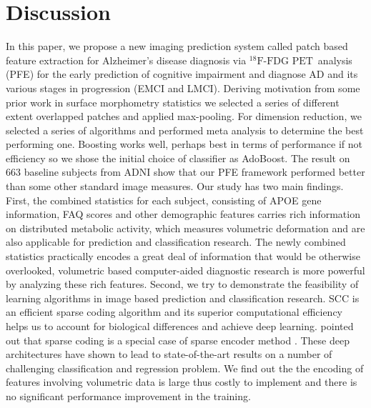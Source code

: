 \documentclass[authoryear,preprint,revi	ew,12pt]{elsarticle}
\newcommand{\Alz} {{Alzheimer\textquoteright s} }
\newcommand{\FDGPET}   {$ ^{18}\textrm{F-FDG PET} $~}
\begin{document}
\section{Discussion}
In this paper, we propose a new imaging prediction system called patch based feature extraction for \Alz disease diagnosis via \FDGPET analysis (PFE) for the early prediction of cognitive impairment and diagnose AD and its various stages in progression (EMCI and LMCI). Deriving motivation from some prior work in surface morphometry statistics  \citep{zhang2016applying,zhang2016hyperbolic}  we selected a series of different extent overlapped patches and applied max-pooling. For dimension reduction, we selected a series of algorithms and performed meta analysis to determine the best performing one. Boosting works well, perhaps best in terms of performance if not efficiency so we shose the initial choice of classifier as AdoBoost. The result on 663 baseline subjects from ADNI show that our PFE framework performed better than some other standard image measures. Our study has two main findings. First, the combined statistics for each subject, consisting of APOE gene information, FAQ scores and other demographic features carries rich information on distributed metabolic activity, which measures volumetric deformation and are also applicable for prediction and classification research. The newly combined statistics practically encodes a great deal of information that would be otherwise overlooked, volumetric based computer-aided diagnostic research is more powerful by analyzing these rich features. Second, we try to demonstrate the feasibility of learning algorithms in image based prediction and classification research. SCC is an efficient sparse coding algorithm and its superior computational efficiency helps us to account for biological differences and achieve deep learning. \citep{gregor2010learning} pointed out that sparse coding is a special case of sparse encoder method \citep{vincent2010stacked,baldi2012autoencoders}. These deep architectures have shown to lead to state-of-the-art results on a number of challenging classification and regression problem. We find out the the encoding of features involving volumetric data is large thus costly to implement and there is no significant performance improvement in the training.  
\end{document}
